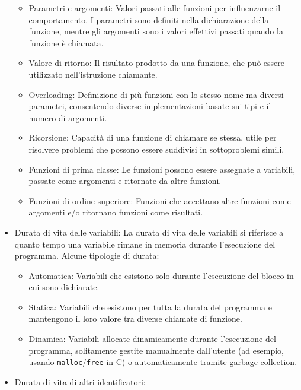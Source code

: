 \documentclass[
  letterpaper,
]{scrbook}
\providecommand{\tightlist}{%
  \setlength{\itemsep}{0pt}\setlength{\parskip}{0pt}}\usepackage{longtable,booktabs,array}
\begin{document}
\begin{itemize}
  \begin{itemize}
  \tightlist
  \item
    Parametri e argomenti: Valori passati alle funzioni per influenzarne
    il comportamento. I parametri sono definiti nella dichiarazione
    della funzione, mentre gli argomenti sono i valori effettivi passati
    quando la funzione è chiamata.
  \item
    Valore di ritorno: Il risultato prodotto da una funzione, che può
    essere utilizzato nell'istruzione chiamante.
  \item
    Overloading: Definizione di più funzioni con lo stesso nome ma
    diversi parametri, consentendo diverse implementazioni basate sui
    tipi e il numero di argomenti.
  \item
    Ricorsione: Capacità di una funzione di chiamare se stessa, utile
    per risolvere problemi che possono essere suddivisi in sottoproblemi
    simili.
  \item
    Funzioni di prima classe: Le funzioni possono essere assegnate a
    variabili, passate come argomenti e ritornate da altre funzioni.
  \item
    Funzioni di ordine superiore: Funzioni che accettano altre funzioni
    come argomenti e/o ritornano funzioni come risultati.
  \end{itemize}
\item
  Durata di vita delle variabili: La durata di vita delle variabili si
  riferisce a quanto tempo una variabile rimane in memoria durante
  l'esecuzione del programma. Alcune tipologie di durata:

  \begin{itemize}
  \tightlist
  \item
    Automatica: Variabili che esistono solo durante l'esecuzione del
    blocco in cui sono dichiarate.
  \item
    Statica: Variabili che esistono per tutta la durata del programma e
    mantengono il loro valore tra diverse chiamate di funzione.
  \item
    Dinamica: Variabili allocate dinamicamente durante l'esecuzione del
    programma, solitamente gestite manualmente dall'utente (ad esempio,
    usando \texttt{malloc}/\texttt{free} in C) o automaticamente tramite
    garbage collection.
  \end{itemize}
\item
  Durata di vita di altri identificatori:


\end{itemize}
\end{document}
